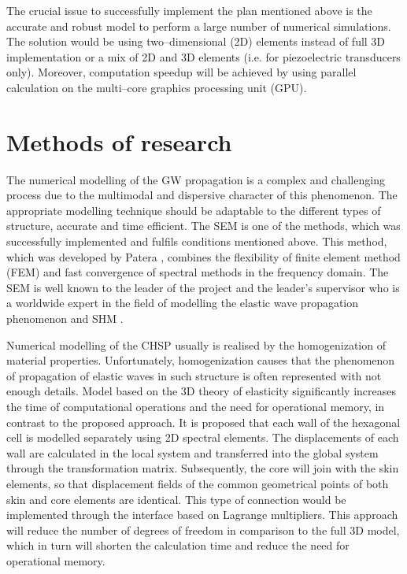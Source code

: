 \documentclass[a4paper,12pt]{article}
\begin{document}
The crucial issue to successfully implement the plan mentioned above is the accurate and robust model to perform a large number of numerical simulations. The solution would be using two--dimensional (2D) elements instead of full 3D implementation or a mix of 2D and 3D elements (i.e. for piezoelectric transducers only). Moreover, computation speedup will be achieved by using parallel calculation on the multi--core graphics processing unit (GPU).

\section{Methods of research}
The numerical modelling of the GW propagation is a complex and challenging process due to the multimodal and dispersive character of this phenomenon. The appropriate modelling technique should be adaptable to the different types of structure, accurate and time efficient. The SEM is one of the methods, which was successfully implemented and fulfils conditions mentioned above. This method, which was developed by Patera \cite{patera1984spectral}, combines the flexibility of finite element method (FEM) and fast convergence of spectral methods in the frequency domain. The SEM is well known to the leader of the project \cite{fiborek2018time, sikdar2018effects} and the leader’s supervisor who is a worldwide expert in the field of modelling the elastic wave propagation phenomenon \cite{kudela2007modelling,kudela20093d,kudela2016parallel} and SHM \cite{ostachowicz2009damage}.

Numerical modelling of the CHSP usually is realised by the homogenization of material properties. Unfortunately, homogenization causes that the phenomenon of propagation of elastic waves in such structure is often represented with not enough details. Model based on the 3D theory of elasticity significantly increases the time of computational operations and the need for operational memory, in contrast to the proposed approach. It is proposed that each wall of the hexagonal cell is modelled separately using 2D spectral elements. The displacements of each wall are calculated in the local system and transferred into the global system through the transformation matrix. Subsequently, the core will join with the skin elements, so that displacement fields of the common geometrical points of both skin and core elements are identical. This type of connection would be implemented through the interface based on Lagrange multipliers. This approach will reduce the number of degrees of freedom in comparison to the full 3D model, which in turn will shorten the calculation time and reduce the need for operational memory.
\end{document}
